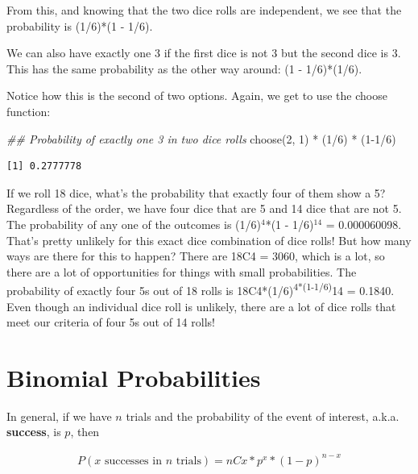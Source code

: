 \documentclass[
  letterpaper,
  DIV=11,
  numbers=noendperiod,
  oneside]{scrreprt}
\newenvironment{Shaded}{\begin{snugshade}}{\end{snugshade}}
\newcommand{\DecValTok}[1]{\textcolor[rgb]{0.68,0.00,0.00}{#1}}
\newcommand{\DocumentationTok}[1]{\textcolor[rgb]{0.37,0.37,0.37}{\textit{#1}}}
\newcommand{\FunctionTok}[1]{\textcolor[rgb]{0.28,0.35,0.67}{#1}}
\newcommand{\NormalTok}[1]{\textcolor[rgb]{0.00,0.23,0.31}{#1}}
\newcommand{\SpecialCharTok}[1]{\textcolor[rgb]{0.37,0.37,0.37}{#1}}
\begin{document}
From this, and knowing that the two dice rolls are independent, we see
that the probability is (1/6)*(1 - 1/6).

We can also have exactly one 3 if the first dice is not 3 but the second
dice is 3. This has the same probability as the other way around: (1 -
1/6)*(1/6).

Notice how this is the second of two options. Again, we get to use the
choose function:

\begin{Shaded}
\begin{Highlighting}[]
\DocumentationTok{\#\# Probability of exactly one 3 in two dice rolls}
\FunctionTok{choose}\NormalTok{(}\DecValTok{2}\NormalTok{, }\DecValTok{1}\NormalTok{) }\SpecialCharTok{*}\NormalTok{ (}\DecValTok{1}\SpecialCharTok{/}\DecValTok{6}\NormalTok{) }\SpecialCharTok{*}\NormalTok{ (}\DecValTok{1{-}1}\SpecialCharTok{/}\DecValTok{6}\NormalTok{)}
\end{Highlighting}
\end{Shaded}

\begin{verbatim}
[1] 0.2777778
\end{verbatim}

If we roll 18 dice, what's the probability that exactly four of them
show a 5? Regardless of the order, we have four dice that are 5 and 14
dice that are not 5. The probability of any one of the outcomes is
(1/6)\(^4\)*(1 - 1/6)\(^{14}\) = 0.000060098. That's pretty unlikely for
this exact dice combination of dice rolls! But how many ways are there
for this to happen? There are 18C4 = 3060, which is a lot, so there are
a lot of opportunities for things with small probabilities. The
probability of exactly four 5s out of 18 rolls is
18C4*(1/6)\textsuperscript{4*(1-1/6)}14 = 0.1840. Even though an
individual dice roll is unlikely, there are a lot of dice rolls that
meet our criteria of four 5s out of 14 rolls!

\hypertarget{binomial-probabilities-1}{%
\section{Binomial Probabilities}\label{binomial-probabilities-1}}

In general, if we have \(n\) trials and the probability of the event of
interest, a.k.a. \textbf{success}, is \(p\), then

\begin{align*}
P(x\text{ successes in }n\text{ trials}) = nCx*p^x*(1-p)^{n-x}
\end{align*}
\end{document}
